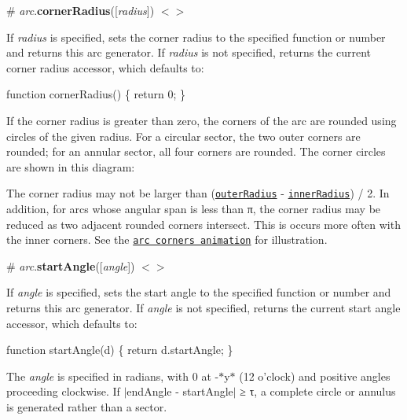 \label{_arc_cornerRadius}%
\# {\itshape arc}.{\bfseries corner\+Radius}(\mbox{[}{\itshape radius}\mbox{]}) \href{https://github.com/d3/d3-shape/blob/master/src/arc.js#L238}{\tt $<$$>$}

If {\itshape radius} is specified, sets the corner radius to the specified function or number and returns this arc generator. If {\itshape radius} is not specified, returns the current corner radius accessor, which defaults to\+:


\begin{DoxyCode}
function cornerRadius() \{
  return 0;
\}
\end{DoxyCode}


If the corner radius is greater than zero, the corners of the arc are rounded using circles of the given radius. For a circular sector, the two outer corners are rounded; for an annular sector, all four corners are rounded. The corner circles are shown in this diagram\+:

\href{http://bl.ocks.org/mbostock/e5e3680f3079cf5c3437}{\tt }\href{http://bl.ocks.org/mbostock/f41f50e06a6c04828b6e}{\tt }

The corner radius may not be larger than (\href{#arc_outerRadius}{\tt outer\+Radius} -\/ \href{#arc_innerRadius}{\tt inner\+Radius}) / 2. In addition, for arcs whose angular span is less than π, the corner radius may be reduced as two adjacent rounded corners intersect. This is occurs more often with the inner corners. See the \href{http://bl.ocks.org/mbostock/b7671cb38efdfa5da3af}{\tt arc corners animation} for illustration.

\label{_arc_startAngle}%
\# {\itshape arc}.{\bfseries start\+Angle}(\mbox{[}{\itshape angle}\mbox{]}) \href{https://github.com/d3/d3-shape/blob/master/src/arc.js#L246}{\tt $<$$>$}

If {\itshape angle} is specified, sets the start angle to the specified function or number and returns this arc generator. If {\itshape angle} is not specified, returns the current start angle accessor, which defaults to\+:


\begin{DoxyCode}
function startAngle(d) \{
  return d.startAngle;
\}
\end{DoxyCode}


The {\itshape angle} is specified in radians, with 0 at -\/$\ast$y$\ast$ (12 o’clock) and positive angles proceeding clockwise. If $\vert$end\+Angle -\/ start\+Angle$\vert$ ≥ τ, a complete circle or annulus is generated rather than a sector.

